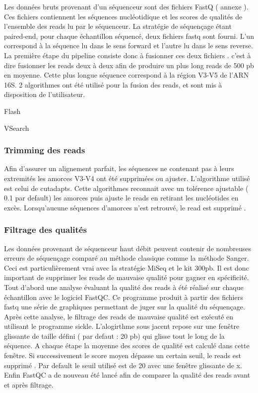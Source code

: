 \documentclass[12pt,a4paper]{article}
\begin{document}
Les données bruts provenant d’un séquenceur sont des fichiers FastQ ( annexe ). Ces fichiers contiennent les séquences nucléotidique et les scores de qualités de l’ensemble des reads lu par le séquenceur. La stratégie de séquençage étant paired-end, pour chaque échantillon séquencé, deux fichiers fastq sont fourni. L’un correspond à la séquence lu dans le sens forward et l’autre lu dans le sens reverse.
La première étape du pipeline consiste donc à fusionner ces deux fichiers . c’est à dire fusionner les reads deux à deux afin de produire un plus long reads de 500 pb en moyenne. Cette plus longue séquence correspond à la région V3-V5 de l’ARN 16S.
2 algorithmes ont été utilisé pour la fusion des reads, et sont mis à disposition de l’utilisateur.

Flash

VSearch

\subsubsection{Trimming des reads}

Afin d’assurer un alignement parfait, les séquences ne contenant pas à leurs extremités les amorces V3-V4 ont été supprimées ou ajuster.
L’algorithme utilisé est celui de cutadapts. Cette algorithmes reconnait avec un tolérence ajustable ( 0.1 par default) les amorces puis ajuste le reads en retirant les nucléotides en excès. Lorsqu’aucune séquences d’amorces n’est retrouvé, le read est supprimé .

\subsubsection{Filtrage des qualités}

Les données provenant de séquenceur haut débit peuvent contenir de nombreuses erreurs de séquençage comparé au méthode classique comme la méthode Sanger. Ceci est particulièrement vrai avec la stratégie MiSeq et le kit 300pb. Il est donc important de supprimer les reads de mauvaise qualité pour gagner en spécificité.
Tout d’abord une analyse évaluant la qualité des reads à été réalisé sur chaque échantillon avec le logiciel FastQC. Ce programme produit à partir des fichiers fastq une série de graphiques permettant de juger sur la qualité du séquençage.
Après cette analyse, le filtrage des reads de mauvaise qualité est exécuté en utilisant le programme sickle. L’alogirthme sous jacent repose sur une fenêtre glissante de taille défini ( par defaut : 20 pb) qui glisse tout le long de la séquence. A chaque étape la moyenne des scores de qualité est calculé dans cette fenêtre. Si successivement le score moyen dépasse un certain seuil, le reads est supprimé . Par default le seuil utilisé est de 20 avec une fenêtre glissante de x.
Enfin FastQC a de nouveau été lancé afin de comparer la qualité des reads avant et après filtrage.
\end{document}
